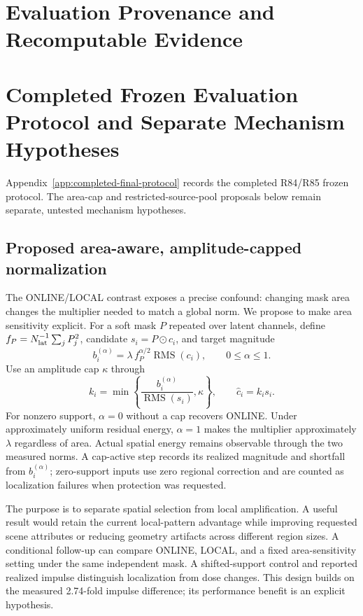 \documentclass[conference]{IEEEtran}
\newcommand{\RMS}{\operatorname{RMS}}
\begin{document}
\section{Evaluation Provenance and Recomputable Evidence}
\label{sec:evaluation-provenance}


\section{Completed Frozen Evaluation Protocol and Separate Mechanism Hypotheses}
\label{sec:prospective-controls}
Appendix~\ref{app:completed-final-protocol} records the completed R84/R85 frozen protocol. The area-cap and restricted-source-pool proposals below remain separate, untested mechanism hypotheses.



\subsection{Proposed area-aware, amplitude-capped normalization}
The ONLINE/LOCAL contrast exposes a precise confound: changing mask area changes the multiplier needed to match a global norm. We propose to make area sensitivity explicit. For a soft mask $P$ repeated over latent channels, define $f_P=N_{\rm lat}^{-1}\sum_j P_j^2$, candidate $s_i=P\odot c_i$, and target magnitude
\begin{equation}
b_i^{(\alpha)}=\lambda\, f_P^{\alpha/2}\RMS(c_i),\qquad 0\leq\alpha\leq1.
\label{eq:area-budget}
\end{equation}
Use an amplitude cap $\kappa$ through
\begin{equation}
k_i=\min\left\{\frac{b_i^{(\alpha)}}{\RMS(s_i)},\kappa\right\},\qquad
\widehat c_i=k_i s_i.
\label{eq:capped}
\end{equation}
For nonzero support, $\alpha=0$ without a cap recovers ONLINE. Under approximately uniform residual energy, $\alpha=1$ makes the multiplier approximately $\lambda$ regardless of area. Actual spatial energy remains observable through the two measured norms. A cap-active step records its realized magnitude and shortfall from $b_i^{(\alpha)}$; zero-support inputs use zero regional correction and are counted as localization failures when protection was requested.

The purpose is to separate spatial selection from local amplification. A useful result would retain the current local-pattern advantage while improving requested scene attributes or reducing geometry artifacts across different region sizes. A conditional follow-up can compare ONLINE, LOCAL, and a fixed area-sensitivity setting under the same independent mask. A shifted-support control and reported realized impulse distinguish localization from dose changes. This design builds on the measured 2.74-fold impulse difference; its performance benefit is an explicit hypothesis.
\end{document}
